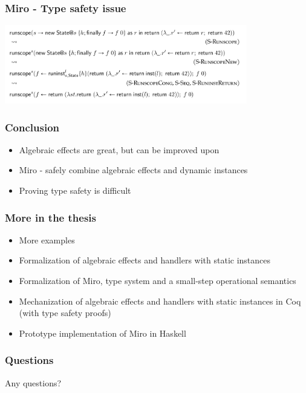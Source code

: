 \documentclass{beamer}
\begin{document}
\begin{frame}[fragile]\frametitle{Miro - Type safety issue}
\begin{center}
\includegraphics[width=300pt]{images/counter-example.png}
\end{center}
\end{frame}

\begin{frame}[fragile]\frametitle{Conclusion}
\begin{itemize}
\item Algebraic effects are great, but can be improved upon
\item Miro - safely combine algebraic effects and dynamic instances
\item Proving type safety is difficult
\end{itemize}
\end{frame}

\begin{frame}[fragile]\frametitle{More in the thesis}
\begin{itemize}
\item More examples
\item Formalization of algebraic effects and handlers with static instances
\item Formalization of Miro, type system and a small-step operational semantics
\item Mechanization of algebraic effects and handlers with static instances in Coq (with type safety proofs)
\item Prototype implementation of Miro in Haskell
\end{itemize}
\end{frame}

\begin{frame}[fragile]\frametitle{Questions}
Any questions?
\end{frame}
\end{document}
